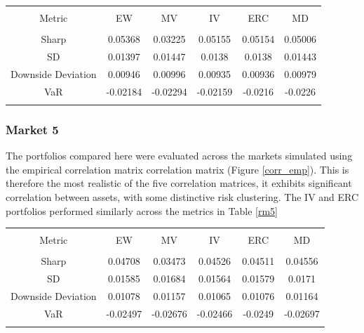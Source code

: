 \documentclass[11pt,preprint, authoryear]{elsarticle}
\let\origtable\table
\let\endorigtable\endtable
\renewenvironment{table}[1][2] {
    \expandafter\origtable\expandafter[H]
} {
    \endorigtable
}
\numberwithin{equation}{section}
\numberwithin{figure}{section}
\numberwithin{table}{section}
\begin{document}
\begin{table}[!htbp] \centering 
  \caption{Market 4 - Portfolio Risk Metrics} 
  \label{rm4} 
\begin{tabular}{@{\extracolsep{5pt}} cccccc} 
\\[-1.8ex]\hline 
\hline \\[-1.8ex] 
Metric & EW & MV & IV & ERC & MD \\ 
\hline \\[-1.8ex] 
Sharp & 0.05368 & 0.03225 & 0.05155 & 0.05154 & 0.05006 \\ 
SD & 0.01397 & 0.01447 & 0.0138 & 0.0138 & 0.01443 \\ 
Downside Deviation & 0.00946 & 0.00996 & 0.00935 & 0.00936 & 0.00979 \\ 
VaR & -0.02184 & -0.02294 & -0.02159 & -0.0216 & -0.0226 \\ 
\hline \\[-1.8ex] 
\end{tabular} 
\end{table}

\hypertarget{market-5}{%
\subsubsection{Market 5}\label{market-5}}

The portfolios compared here were evaluated across the markets simulated
using the empirical correlation matrix correlation matrix (Figure
\ref{corr_emp}). This is therefore the most realistic of the five
correlation matrices, it exhibits significant correlation between
assets, with some distinctive risk clustering. The IV and ERC portfolios
performed similarly across the metrics in Table \ref{rm5}

\begin{table}[!htbp] \centering 
  \caption{Market 5 Risk Metrics} 
  \label{rm5} 
\begin{tabular}{@{\extracolsep{5pt}} cccccc} 
\\[-1.8ex]\hline 
\hline \\[-1.8ex] 
Metric & EW & MV & IV & ERC & MD \\ 
\hline \\[-1.8ex] 
Sharp & 0.04708 & 0.03473 & 0.04526 & 0.04511 & 0.04556 \\ 
SD & 0.01585 & 0.01684 & 0.01564 & 0.01579 & 0.0171 \\ 
Downside Deviation & 0.01078 & 0.01157 & 0.01065 & 0.01076 & 0.01164 \\ 
VaR & -0.02497 & -0.02676 & -0.02466 & -0.0249 & -0.02697 \\ 
\hline \\[-1.8ex] 
\end{tabular} 
\end{table}
\end{document}
